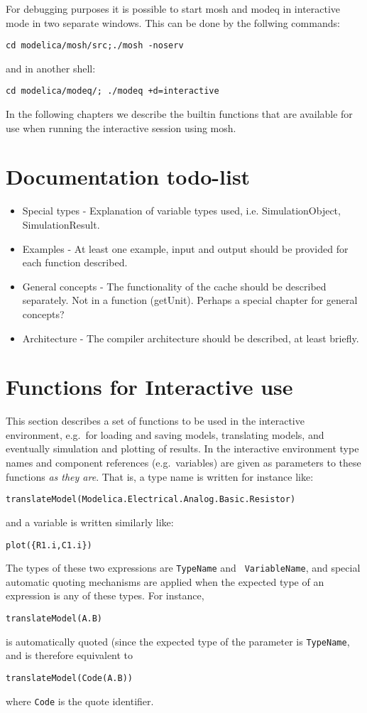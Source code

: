 \documentclass{report}
\begin{document}
For debugging purposes it is possible to start mosh and modeq in
interactive mode in two separate windows. This can be done by the
follwing commands:
\begin{verbatim}
cd modelica/mosh/src;./mosh -noserv
\end{verbatim}
and in another shell:
\begin{verbatim}
cd modelica/modeq/; ./modeq +d=interactive 
\end{verbatim}

In the following chapters we describe the builtin functions that are
available for use when running the interactive session using mosh.


\chapter{Documentation todo-list}

\begin{itemize} 
\item{Special types} - Explanation of variable types used, i.e.
  SimulationObject, SimulationResult.
\item{Examples} - At least one example, input and output should be
  provided for each function described.
\item{General concepts} - The functionality of the cache should be described
  separately. Not in a function (getUnit). Perhaps a special chapter
  for general concepts?
\item{Architecture} - The compiler architecture should be described,
  at least briefly.

\end{itemize}


\chapter{Functions for Interactive use}
This section describes a set of functions to be used in the
interactive environment, e.g.\ for loading and saving models,
translating models, and eventually simulation and plotting of results.
In the interactive environment type names and component references
(e.g.\ variables) are given as parameters to these functions \emph{as
they are}. That is, a type name is written for instance like:
\begin{verbatim}
translateModel(Modelica.Electrical.Analog.Basic.Resistor)
\end{verbatim}
and a variable is written similarly like:
\begin{verbatim}
plot({R1.i,C1.i})
\end{verbatim}
The types of these two expressions are {\tt TypeName} and {\tt
VariableName}, and special automatic quoting mechanisms are applied
when the expected type of an expression is any of these types.
For instance,
\begin{verbatim}
translateModel(A.B)
\end{verbatim}
is automatically quoted (since the expected type of the parameter is
{\tt TypeName}, and is therefore equivalent to
\begin{verbatim}
translateModel(Code(A.B))
\end{verbatim}
where {\tt Code} is the quote identifier.
\end{document}

